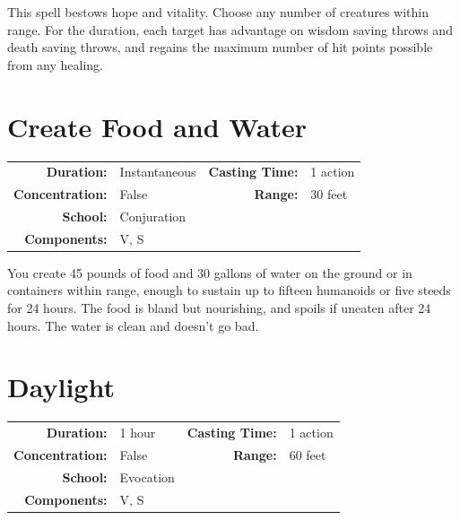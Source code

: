 \documentclass[12pt,showtrims]{memoir}
\begin{document}
\vspace{1\baselineskip}\noindent This spell bestows hope and vitality. Choose any number of creatures within range. For the duration, each target has advantage on wisdom saving throws and death saving throws, and regains the maximum number of hit points possible from any healing.

\newpage
\section*{Create Food and Water}

{
\small\centering\vspace{-6pt}
\begin{tabular}{rlrl}
\toprule

\textbf{Duration:} & Instantaneous &
\textbf{Casting Time:} & 1 action \\
\textbf{Concentration:} & False &
\textbf{Range:} & 30 feet \\
\textbf{School:} & Conjuration \\
\textbf{Components:} & \multicolumn{3}{p{0.7\textwidth}}{V, S}\\

\bottomrule
\end{tabular}
}

\vspace{1\baselineskip}\noindent You create 45 pounds of food and 30 gallons of water on the ground or in containers within range, enough to sustain up to fifteen humanoids or five steeds for 24 hours. The food is bland but nourishing, and spoils if uneaten after 24 hours. The water is clean and doesn't go bad.

\newpage
\section*{Daylight}

{
\small\centering\vspace{-6pt}
\begin{tabular}{rlrl}
\toprule

\textbf{Duration:} & 1 hour &
\textbf{Casting Time:} & 1 action \\
\textbf{Concentration:} & False &
\textbf{Range:} & 60 feet \\
\textbf{School:} & Evocation \\
\textbf{Components:} & \multicolumn{3}{p{0.7\textwidth}}{V, S}\\

\bottomrule
\end{tabular}
}
\end{document}
